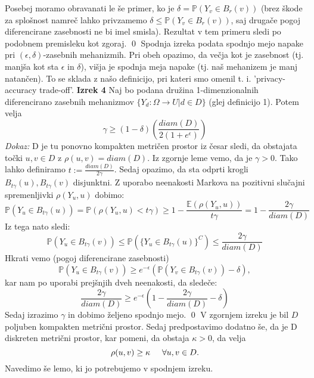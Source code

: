 \documentclass[mat1]{article}
\theoremstyle{definition}
\begin{document}
Posebej moramo obravanati le še primer, ko je $\delta = \mathbb{P}(Y_v \in B_r(v))$ (brez škode za splošnost namreč lahko privzamemo $\delta \leq \mathbb{P}(Y_v \in B_r(v))$, saj drugače pogoj diferencirane zasebnosti ne bi imel smisla). Rezultat v tem primeru sledi po podobnem premisleku kot zgoraj.
\newline
\qed
\newline
\newline
Spodnja izreka podata spodnjo mejo napake pri $(\epsilon, \delta)$-zasebnih mehanizmih. Pri obeh opazimo, da večja kot je zasebnost (tj. manjša kot sta $\epsilon$ in $\delta$), višja je spodnja meja napake (tj. naš mehanizem je manj natančen). To se sklada z našo definicijo, pri kateri smo omenil t. i. 'privacy-accuracy trade-off'.
\newline
\newline
\textbf{Izrek 4} Naj bo podana družina 1-dimenzionalnih diferencirano zasebnih mehanizmov $\{ Y_d: \Omega \rightarrow U | d \in D\}$ (glej definicijo 1). Potem velja $$\gamma  \geq (1-\delta)(\frac{diam(D)}{2(1+e^\epsilon)})$$
\newline
\newline
\textit{Dokaz:}  D je tu ponovno kompakten metričen prostor iz česar sledi, da obstajata točki $u, v \in D$ z $\rho(u,v) = diam(D)$. Iz zgornje leme vemo, da je $\gamma > 0$. Tako lahko definiramo $t := \frac{diam(D)}{2\gamma}$. Sedaj opazimo, da sta odprti krogli $B_{t\gamma}(u), B_{t\gamma}(v) $ disjunktni. Z uporabo neenakosti Markova na pozitivni slučajni spremenljivki $\rho(Y_u, u)$ dobimo: $$\mathbb{P}(Y_u \in B_{t\gamma}(u)) = \mathbb{P}(\rho(Y_u,u) < t\gamma) \geq 1 - \frac{\mathbb{E}(\rho(Y_u,u))}{t\gamma} = 1 - \frac{2\gamma}{diam(D)} $$ 
Iz tega nato sledi: $$\mathbb{P}(Y_u \in B_{t\gamma}(v)) \leq \mathbb{P}(\{Y_u \in B_{t\gamma}(u)\}^C) \leq \frac{2\gamma}{diam(D)}$$ Hkrati vemo (pogoj diferencirane zasebnosti) $$\mathbb{P}(Y_u \in B_{t\gamma}(v)) \geq e^{-\epsilon}(\mathbb{P}(Y_v \in B_{t\gamma}(v)) - \delta),$$ kar nam po uporabi prejšnjih dveh neenakosti, da sledeče: $$\frac{2\gamma}{diam(D)} \geq e^{-\epsilon}(1 - \frac{2\gamma}{diam(D)} - \delta) $$ Sedaj izrazimo $\gamma$ in dobimo željeno spodnjo mejo.
\newline
\qed
\newline
\newline
V zgornjem izreku je bil $D$ poljuben kompakten metrični prostor. Sedaj predpostavimo dodatno še, da je D diskreten metrični prostor, kar pomeni, da obstaja $\kappa > 0$, da velja $$\rho(u,v) \geq \kappa \hspace{0.5cm}  \forall u, v \in D.$$ Navedimo še lemo, ki jo potrebujemo v spodnjem izreku. 
\end{document}
